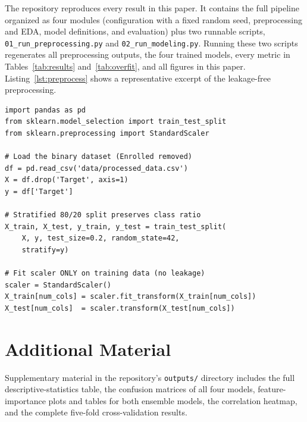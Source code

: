 \documentclass[conference]{IEEEtran}
\begin{document}
	\vspace{6pt}
	\noindent The repository reproduces every result in this paper. It contains the full pipeline organized as four modules (configuration with a fixed random seed, preprocessing and EDA, model definitions, and evaluation) plus two runnable scripts, \texttt{01\_run\_preprocessing.py} and \texttt{02\_run\_modeling.py}. Running these two scripts regenerates all preprocessing outputs, the four trained models, every metric in Tables~\ref{tab:results} and~\ref{tab:overfit}, and all figures in this paper. Listing~\ref{lst:preprocess} shows a representative excerpt of the leakage-free preprocessing.
	
	\begin{lstlisting}[caption={Representative excerpt: stratified split with leakage-free scaling.}, label={lst:preprocess}]
import pandas as pd
from sklearn.model_selection import train_test_split
from sklearn.preprocessing import StandardScaler

# Load the binary dataset (Enrolled removed)
df = pd.read_csv('data/processed_data.csv')
X = df.drop('Target', axis=1)
y = df['Target']

# Stratified 80/20 split preserves class ratio
X_train, X_test, y_train, y_test = train_test_split(
    X, y, test_size=0.2, random_state=42,
    stratify=y)

# Fit scaler ONLY on training data (no leakage)
scaler = StandardScaler()
X_train[num_cols] = scaler.fit_transform(X_train[num_cols])
X_test[num_cols]  = scaler.transform(X_test[num_cols])
	\end{lstlisting}
	
	\section{Additional Material}
	\label{app:additional}
	
	Supplementary material in the repository's \texttt{outputs/} directory includes the full descriptive-statistics table, the confusion matrices of all four models, feature-importance plots and tables for both ensemble models, the correlation heatmap, and the complete five-fold cross-validation results.
	
\end{document}
